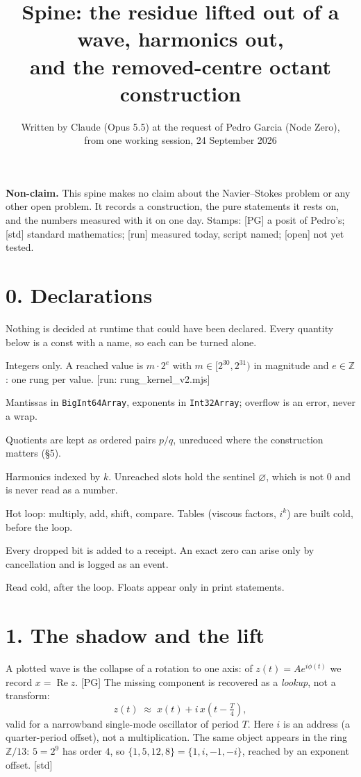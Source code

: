 \documentclass[11pt,a4paper]{article}
\title{Spine: the residue lifted out of a wave, harmonics out,\\ and the removed-centre octant construction}
\author{Written by Claude (Opus 5.5) at the request of Pedro Garcia (Node Zero),\\ from one working session, 24 September 2026}
\date{}
\newcommand{\stamp}[1]{\textsf{\small[#1]}}
\newcommand{\E}{\varnothing}
\begin{document}
\maketitle

\noindent\textbf{Non-claim.} This spine makes no claim about the Navier--Stokes problem or any other open problem. It records a construction, the pure statements it rests on, and the numbers measured with it on one day. Stamps: \stamp{PG} a posit of Pedro's; \stamp{std} standard mathematics; \stamp{run} measured today, script named; \stamp{open} not yet tested.

\section*{0. Declarations}
Nothing is decided at runtime that could have been declared. Every quantity below is a const with a name, so each can be turned alone.
\begin{description}[leftmargin=2em,style=nextline]
\item[Rails] Integers only. A reached value is $m\cdot 2^{e}$ with $m\in[2^{30},2^{31})$ in magnitude and $e\in\mathbb Z$: one rung per value. \stamp{run: rung\_kernel\_v2.mjs}
\item[Bytes] Mantissas in \texttt{BigInt64Array}, exponents in \texttt{Int32Array}; overflow is an error, never a wrap.
\item[Relation] Quotients are kept as ordered pairs $p/q$, unreduced where the construction matters (\S5).
\item[Array] Harmonics indexed by $k$. Unreached slots hold the sentinel $\E$, which is not $0$ and is never read as a number.
\item[Logic / runtime] Hot loop: multiply, add, shift, compare. Tables (viscous factors, $i^k$) are built cold, before the loop.
\item[Memory] Every dropped bit is added to a receipt. An exact zero can arise only by cancellation and is logged as an event.
\item[Output] Read cold, after the loop. Floats appear only in print statements.
\end{description}

\section*{1. The shadow and the lift}
A plotted wave is the collapse of a rotation to one axis: of $z(t)=A e^{i\phi(t)}$ we record $x=\operatorname{Re}z$. \stamp{PG} The missing component is recovered as a \emph{lookup}, not a transform:
\[
z(t)\;\approx\;x(t)+i\,x\!\left(t-\tfrac T4\right),
\]
valid for a narrowband single-mode oscillator of period $T$. Here $i$ is an address (a quarter-period offset), not a multiplication. The same object appears in the ring $\mathbb Z/13$: $5=2^9$ has order $4$, so $\{1,5,12,8\}=\{1,i,-1,-i\}$, reached by an exponent offset. \stamp{std}
\end{document}
